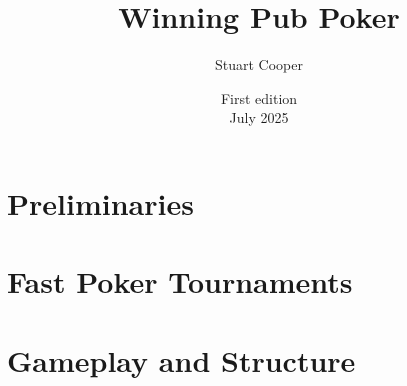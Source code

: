 \documentclass{book}
\begin{document}



\title{Winning Pub Poker}
\author{Stuart Cooper}
\date{First edition\\July 2025}


\maketitle
\tableofcontents

\part{Preliminaries}










\part{Fast Poker Tournaments}







\part{Gameplay and Structure}



\end{document}
